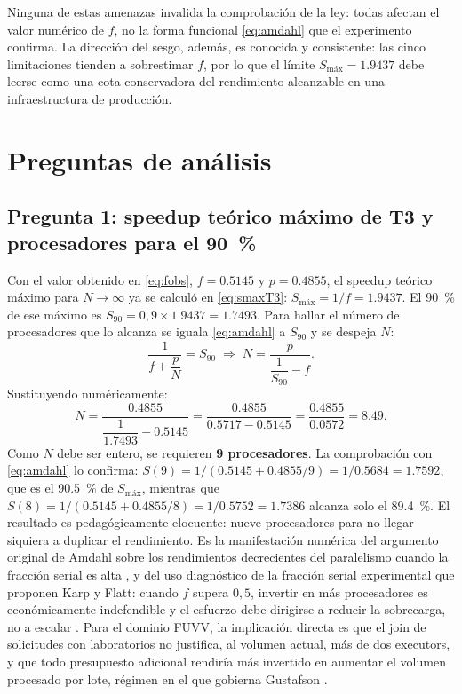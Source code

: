 \documentclass[10pt,journal]{IEEEtran}
\begin{document}
Ninguna de estas amenazas invalida la comprobaci\'on de la ley: todas afectan
el valor num\'erico de $f$, no la forma funcional \eqref{eq:amdahl} que el
experimento confirma. La direcci\'on del sesgo, adem\'as, es conocida y
consistente: las cinco limitaciones tienden a sobrestimar $f$, por lo que el
l\'imite $S_{\text{m\'ax}} = \num{1.9437}$ debe leerse como una cota
conservadora del rendimiento alcanzable en una infraestructura de
producci\'on.

\section{Preguntas de an\'alisis}
\label{sec:preguntas}

\subsection{Pregunta 1: speedup te\'orico m\'aximo de T3 y procesadores para el \SI{90}{\percent}}
Con el valor obtenido en \eqref{eq:fobs}, $f = \num{0.5145}$ y
$p = \num{0.4855}$, el speedup te\'orico m\'aximo para $N \to \infty$ ya se
calcul\'o en \eqref{eq:smaxT3}: $S_{\text{m\'ax}} = 1/f = \num{1.9437}$. El
\SI{90}{\percent} de ese m\'aximo es
$S_{90} = 0{,}9 \times \num{1.9437} = \num{1.7493}$. Para hallar el n\'umero de
procesadores que lo alcanza se iguala \eqref{eq:amdahl} a $S_{90}$ y se
despeja $N$:
\begin{equation}
\frac{1}{f + \dfrac{p}{N}} = S_{90}
\;\Longrightarrow\;
N = \frac{p}{\dfrac{1}{S_{90}} - f}.
\label{eq:n90}
\end{equation}
Sustituyendo num\'ericamente:
\begin{equation}
N = \frac{\num{0.4855}}{\dfrac{1}{\num{1.7493}} - \num{0.5145}}
  = \frac{\num{0.4855}}{\num{0.5717} - \num{0.5145}}
  = \frac{\num{0.4855}}{\num{0.0572}}
  = \num{8.49}.
\label{eq:n90num}
\end{equation}
Como $N$ debe ser entero, se requieren \textbf{9 procesadores}. La
comprobaci\'on con \eqref{eq:amdahl} lo confirma:
$S(9) = 1/(\num{0.5145} + \num{0.4855}/9) = 1/\num{0.5684} = \num{1.7592}$, que
es el \SI{90.5}{\percent} de $S_{\text{m\'ax}}$, mientras que
$S(8) = 1/(\num{0.5145} + \num{0.4855}/8) = 1/\num{0.5752} = \num{1.7386}$
alcanza solo el \SI{89.4}{\percent}. El resultado es pedag\'ogicamente
elocuente: nueve procesadores para no llegar siquiera a duplicar el
rendimiento. Es la manifestaci\'on num\'erica del argumento original de Amdahl
sobre los rendimientos decrecientes del paralelismo cuando la fracci\'on serial
es alta \cite{amdahl1967}, y del uso diagn\'ostico de la fracci\'on serial
experimental que proponen Karp y Flatt: cuando $f$ supera $0{,}5$, invertir en
m\'as procesadores es econ\'omicamente indefendible y el esfuerzo debe
dirigirse a reducir la sobrecarga, no a escalar \cite{karp1990}. Para el
dominio FUVV, la implicaci\'on directa es que el join de solicitudes con
laboratorios no justifica, al volumen actual, m\'as de dos executors, y que
todo presupuesto adicional rendir\'ia m\'as invertido en aumentar el volumen
procesado por lote, r\'egimen en el que gobierna Gustafson
\cite{gustafson1988}.
\end{document}
